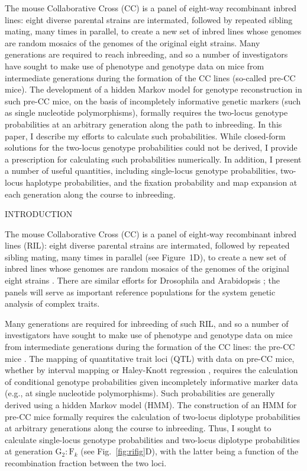 \documentclass[12pt,letterpaper]{article}
\begin{document}
The mouse Collaborative Cross (CC) is a panel of eight-way recombinant
inbred lines: eight diverse parental strains are intermated, followed
by repeated sibling mating, many times in parallel, to create a new
set of inbred lines whose genomes are random mosaics of the genomes of
the original eight strains.  Many generations are required to reach
inbreeding, and so a number of investigators have sought to make use
of phenotype and genotype data on mice from intermediate generations
during the formation of the CC lines (so-called pre-CC mice).  The
development of a hidden Markov model for genotype reconstruction in
such pre-CC mice, on the basis of incompletely informative genetic
markers (such as single nucleotide polymorphisms), formally requires
the two-locus genotype probabilities at an arbitrary generation along
the path to inbreeding.  In this paper, I describe my efforts to
calculate such probabilities.  While closed-form solutions for the
two-locus genotype probabilities could not be derived, I provide a prescription for
calculating such probabilities numerically.  In addition, I present a
number of useful quantities, including single-locus genotype
probabilities, two-locus haplotype probabilities, and the fixation
probability and map expansion at each generation along the course to
inbreeding.



\clearpage
\centerline{INTRODUCTION}

The mouse Collaborative Cross (CC) is a panel of eight-way recombinant
inbred lines (RIL): eight diverse parental strains are intermated,
followed by repeated sibling mating, many times in parallel (see Figure~1D), to create
a new set of inbred lines whose genomes are random mosaics of the
genomes of the original eight strains \citep{CTC2004,CC-CROSS-CC1}. There are
similar efforts for Drosophila \citep{Macdonald2007} and Arabidopsis
\citep{Kover2009}; the panels will serve as important reference
populations for the system genetic analysis of complex traits.

Many generations are required for inbreeding of such RIL, and so
a number of investigators have sought to make use of phenotype
and genotype data on mice from intermediate generations during the
formation of the CC lines: the pre-CC mice \citep[e.g.,
see][]{Aylor2011}.  The mapping of quantitative trait loci (QTL)
with data on pre-CC mice, whether by interval
mapping \citep{Lander1989} or Haley-Knott regression
\citep{Haley1992}, requires the calculation of conditional
genotype probabilities given incompletely informative marker data
(e.g., at single nucleotide polymorphisms).  Such probabilities are generally derived using a
hidden Markov model (HMM).  The construction of an HMM for pre-CC mice
formally requires the calculation of two-locus diplotype 
probabilities
at arbitrary generations along the course to inbreeding.
Thus, I sought to calculate single-locus genotype probabilities and
two-locus diplotype probabilities at generation $\text{G}_2:\text{F}_k$ (see Fig.~\ref{fig:rifig}D),
with the latter being a function of the recombination fraction between
the two loci.  
\end{document}
